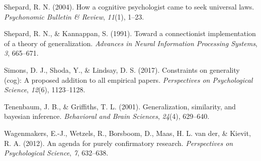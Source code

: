 \documentclass[
  english,
  doc]{apa6}
\begin{document}
\leavevmode\hypertarget{ref-shepard2004cognitive}{}%
Shepard, R. N. (2004). How a cognitive psychologist came to seek universal laws. \emph{Psychonomic Bulletin \& Review}, \emph{11}(1), 1--23.

\leavevmode\hypertarget{ref-shepard1991toward}{}%
Shepard, R. N., \& Kannappan, S. (1991). Toward a connectionist implementation of a theory of generalization. \emph{Advances in Neural Information Processing Systems}, \emph{3}, 665--671.

\leavevmode\hypertarget{ref-simons2017constraints}{}%
Simons, D. J., Shoda, Y., \& Lindsay, D. S. (2017). Constraints on generality (cog): A proposed addition to all empirical papers. \emph{Perspectives on Psychological Science}, \emph{12}(6), 1123--1128.

\leavevmode\hypertarget{ref-tenenbaum2001generalization}{}%
Tenenbaum, J. B., \& Griffiths, T. L. (2001). Generalization, similarity, and bayesian inference. \emph{Behavioral and Brain Sciences}, \emph{24}(4), 629--640.

\leavevmode\hypertarget{ref-Wagenmakers2012}{}%
Wagenmakers, E.-J., Wetzels, R., Borsboom, D., Maas, H. L. van der, \& Kievit, R. A. (2012). An agenda for purely confirmatory research. \emph{Perspectives on Psychological Science}, \emph{7}, 632--638.
\end{document}
